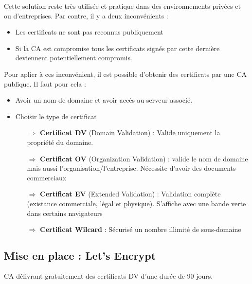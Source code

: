\documentclass[french, 12pt]{article}%
\newcommand{\itemE}{\item[$\bullet$]}
\newcommand{\titreencadre}{Titre}
\newenvironment{encadre}[1]{\renewcommand{\titreencadre}{#1}
	\begin{mdframed}[style=encadrestyle]
	\vspace{0.5\baselineskip}
	}{%
	\end{mdframed}}
\begin{document}
\vspace{0.5cm}

Cette solution reste très utilisée et pratique dans des environnements privées et ou d'entreprises. Par contre, il y a deux inconvénients : 
\begin{itemize}
\itemE Les certificats ne sont pas reconnus publiquement
\itemE Si la CA est compromise tous les certificats signés par cette dernière deviennent potentiellement compromis.
\end{itemize}


Pour aplier à ces inconvénient, il est possible d'obtenir des certificats par une CA publique. Il faut pour cela :  
\begin{itemize}
\itemE Avoir un nom de domaine et avoir accès au serveur associé.
\itemE Choisir le type de certificat
	\begin{itemize}
	\item[$\Rightarrow$] \textbf{Certificat DV} (Domain Validation) : Valide uniquement la propriété du domaine. 
	\item[$\Rightarrow$] \textbf{Certificat OV} (Organization Validation) : valide le nom de domaine mais aussi l'organisation/l'entreprise. Nécessite d'avoir des documents commerciaux
	\item[$\Rightarrow$] \textbf{Certificat EV} (Extended Validation) : Validation complète (existance commerciale, légal et physique). S'affiche avec une bande verte dans certains navigateurs
	\item[$\Rightarrow$] \textbf{Certificat Wilcard} : Sécurisé un nombre illimité de sous-domaine
	\end{itemize}
\end{itemize}

\subsection{Mise en place : Let's Encrypt}

\begin{encadre}{Let's encrypt}
CA délivrant gratuitement des certificats DV d’une durée de 90 jours.
\end{encadre}
\end{document}
